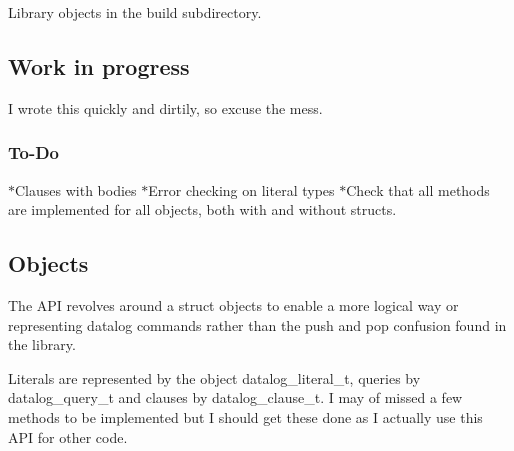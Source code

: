Library objects in the build subdirectory.

\subsection*{Work in progress}

I wrote this quickly and dirtily, so excuse the mess.

\subsubsection*{To-\/\+Do}

$\ast$\+Clauses with bodies $\ast$\+Error checking on literal types $\ast$\+Check that all methods are implemented for all objects, both with and without structs.

\subsection*{Objects}

The A\+PI revolves around a struct objects to enable a more logical way or representing datalog commands rather than the push and pop confusion found in the library.

Literals are represented by the object datalog\+\_\+literal\+\_\+t, queries by datalog\+\_\+query\+\_\+t and clauses by datalog\+\_\+clause\+\_\+t. I may of missed a few methods to be implemented but I should get these done as I actually use this A\+PI for other code. 